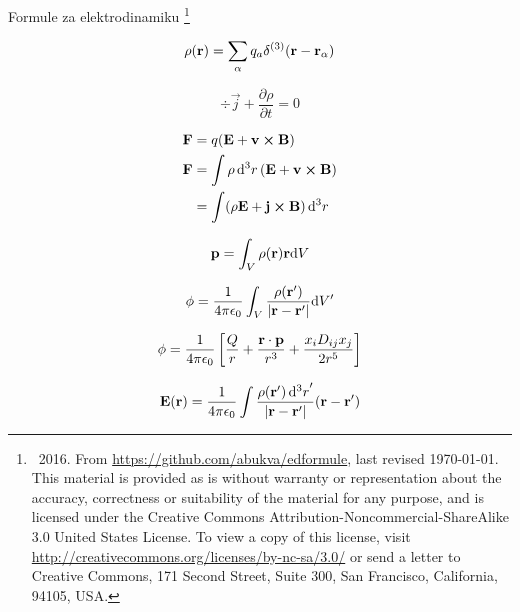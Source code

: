 \documentclass[11pt,twoside]{article}
\date{}
\begin{document}
\begin{center}
\LARGE
Formule za elektrodinamiku \footnote{\textcopyleft \ 2016. From  \url{https://github.com/abukva/edformule}, last revised \today. This material 
is provided as is without warranty or representation about the accuracy, correctness or suitability of the material for any purpose, and is licensed under the Creative Commons Attribution-Noncommercial-ShareAlike 3.0 United States License. To view a copy of this license, visit \url{http://creativecommons.org/licenses/by-nc-sa/3.0/} or send a letter to Creative Commons, 171 Second Street, Suite 300, San Francisco, California, 94105, USA. }
\end{center}
\normalsize
\begin{multicols}{3}

\begin{footnotesize}

\begin{equation}
\rho(\vb{r}) = \sum_\alpha q_a \delta^{(3)}(\vb{r}-\vb{r_\alpha})
\end{equation}

\begin{equation}
\div\vec{j} + \frac{\partial \rho}{\partial t} = 0
\end{equation}

\begin{equation}
\begin{split}
\vb{F} &= q(\vb{E} + \vb{v}\cross\vb{B}) \\
\vb{F} &= \int \rho \dd[3]{r}(\vb{E} + \vb{v}\cross\vb{B}) \\
&= \int (\rho\vb{E} + \vb{j}\cross\vb{B})\dd[3]{r}
\end{split}
\end{equation}

\begin{equation}
\vb{p} = \int_V \rho(\vb{r}) \vb{r} \dd V
\end{equation}

\begin{equation}
\phi = \frac{1}{4 \pi \epsilon_0} \int_V \frac{\rho(\vb{r'})}{|\vb{r}-\vb{r'}|}\dd V'
\end{equation}

\begin{equation}
\phi = \frac{1}{4 \pi \epsilon_0} \left [\frac{Q}{r} + \frac{\vb{r}\cdot\vb{p}}{r^3} + \frac{x_i D_{ij}x_j}{2r^5} \right ]
\end{equation}

\begin{equation}
\vb{E}(\vb{r}) = \frac{1}{4 \pi \epsilon_0} \int \frac{\rho(\vb{r}')\dd[3]{r}'}{\abs{\vb{r}-\vb{r}'}}(\vb{r}-\vb{r}')
\end{equation}


\end{footnotesize}
\end{multicols}
\end{document}
